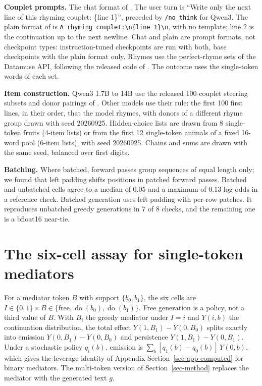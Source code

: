 \documentclass[
]{article}
\begin{document}
\textbf{Couplet prompts.} The chat format of \citet{hanna2026latent}.
The user turn is ``Write only the next line of this rhyming couplet:
\{line 1\}'', preceded by \texttt{/no\_think} for Qwen3. The plain
format of \citet{ma2026plan} is
\texttt{A\ rhyming\ couplet:\textbackslash{}n\{line\ 1\}\textbackslash{}n},
with no template; line 2 is the continuation up to the next newline.
Chat and plain are prompt formats, not checkpoint types:
instruction-tuned checkpoints are run with both, base checkpoints with
the plain format only. Rhymes use the perfect-rhyme sets of the Datamuse
API, following the released code of \citet{hanna2026latent}. The outcome
uses the single-token words of each set.

\textbf{Item construction.} Qwen3 1.7B to 14B use the released
100-couplet steering subsets and donor pairings of
\citet{hanna2026latent}. Other models use their rule: the first 100
first lines, in their order, that the model rhymes, with donors of a
different rhyme group drawn with seed 20260925. Hidden-choice lists are
drawn from 8 single-token fruits (4-item lists) or from the first 12
single-token animals of a fixed 16-word pool (6-item lists), with seed
20260925. Chains and sums are drawn with the same seed, balanced over
first digits.

\textbf{Batching.} Where batched, forward passes group sequences of
equal length only; we found that left padding shifts positions in
patched forward passes. Batched and unbatched cells agree to a median of
0.05 and a maximum of 0.13 log-odds in a reference check. Batched
generation uses left padding with per-row patches. It reproduces
unbatched greedy generations in 7 of 8 checks, and the remaining one is
a bfloat16 near-tie.

\section{The six-cell assay for single-token
mediators}\label{sec-app-sixcell}

For a mediator token \(B\) with support \(\{b_0,b_1\}\), the six cells
are
\(I\in\{0,1\}\times B\in\{\text{free},\operatorname{do}(b_0),\operatorname{do}(b_1)\}\).
Free generation is a policy, not a third value of \(B\). With \(B_i\)
the greedy mediator under \(I=i\) and \(Y(i,b)\) the continuation
distribution, the total effect \(Y(1,B_1)-Y(0,B_0)\) splits exactly into
emission \(Y(0,B_1)-Y(0,B_0)\) and persistence \(Y(1,B_1)-Y(0,B_1)\).
Under a stochastic policy \(q_i(b)\), emission is
\(\sum_b [q_1(b)-q_0(b)]\,Y(0,b)\), which gives the leverage identity of
Appendix Section~\ref{sec-app-computed} for binary mediators. The
multi-token version of Section~\ref{sec-method} replaces the mediator
with the generated text \(g\).
\end{document}
